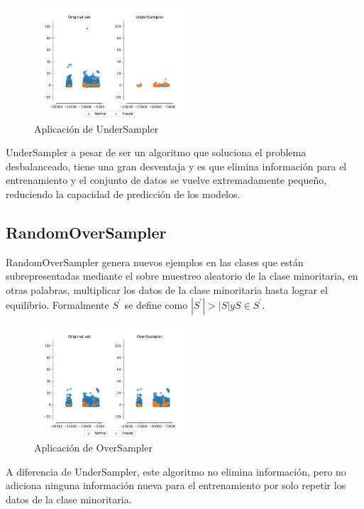 \begin{figure}[h!]
	\centering
	\includegraphics[width=0.5\textwidth]{"figuras/Fig6"}
	\caption{Aplicaci\'{o}n de UnderSampler}
\end{figure}

  UnderSampler a pesar de ser un algoritmo que soluciona el problema desbalanceado, tiene una gran desventaja y es que elimina informaci\'{o}n para el entrenamiento y el conjunto de datos se vuelve extremadamente peque\~{n}o, reduciendo la capacidad de predicci\'{o}n de los modelos.
  
  \subsection{RandomOverSampler}
  
  RandomOverSampler genera nuevos ejemplos en las clases que est\'{a}n subrepresentadas mediante el sobre muestreo aleatorio de la clase minoritaria, en otras palabras, multiplicar los datos de la clase minoritaria hasta lograr el equilibrio. Formalmente $S^{'}$ se define como $|S^{'}|>|S| y S\in S^{'}$.
  
  \begin{figure}[h!]
  	\centering
  	\includegraphics[width=0.5\textwidth]{"figuras/Fig8"}
  	\caption{Aplicaci\'{o}n de OverSampler}
  \end{figure}

  A diferencia de UnderSampler, este algoritmo no elimina informaci\'{o}n, pero no adiciona ninguna informaci\'{o}n nueva para el entrenamiento por solo repetir los datos de la clase minoritaria.
  
